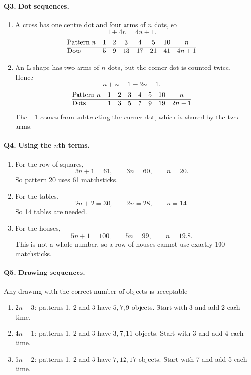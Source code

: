 \documentclass[11pt,a4paper]{article}
\begin{document}
\paragraph{Q3. Dot sequences.}
\begin{enumerate}[label=(\alph*),leftmargin=*,itemsep=4pt]
\item A cross has one centre dot and four arms of \(n\) dots, so
\[
1+4n=4n+1.
\]
\[
\begin{array}{@{}lccccccc@{}}
\text{Pattern }n&1&2&3&4&5&10&n\\ \hline
\text{Dots}&5&9&13&17&21&41&4n+1
\end{array}
\]

\item An L-shape has two arms of \(n\) dots, but the corner dot is counted twice. Hence
\[
n+n-1=2n-1.
\]
\[
\begin{array}{@{}lccccccc@{}}
\text{Pattern }n&1&2&3&4&5&10&n\\ \hline
\text{Dots}&1&3&5&7&9&19&2n-1
\end{array}
\]
The \(-1\) comes from subtracting the corner dot, which is shared by the two arms.
\end{enumerate}

\paragraph{Q4. Using the \(n\)th terms.}
\begin{enumerate}[label=(\alph*),leftmargin=*,itemsep=4pt]
\item For the row of squares,
\[
3n+1=61,\qquad 3n=60,\qquad n=20.
\]
So pattern 20 uses 61 matchsticks.

\item For the tables,
\[
2n+2=30,\qquad 2n=28,\qquad n=14.
\]
So 14 tables are needed.

\item For the houses,
\[
5n+1=100,\qquad 5n=99,\qquad n=19.8.
\]
This is not a whole number, so a row of houses cannot use exactly 100 matchsticks.
\end{enumerate}

\paragraph{Q5. Drawing sequences.}
Any drawing with the correct number of objects is acceptable.
\begin{enumerate}[label=(\alph*),leftmargin=*,itemsep=4pt]
\item \(2n+3\): patterns 1, 2 and 3 have \(5,7,9\) objects. Start with 3 and add 2 each time.
\item \(4n-1\): patterns 1, 2 and 3 have \(3,7,11\) objects. Start with 3 and add 4 each time.
\item \(5n+2\): patterns 1, 2 and 3 have \(7,12,17\) objects. Start with 7 and add 5 each time.
\end{enumerate}
\end{document}
